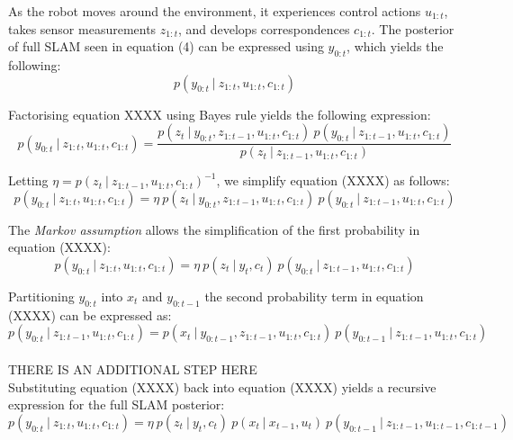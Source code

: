 \documentclass[a4paper]{article}
\begin{document}
As the robot moves around the environment, it experiences control actions $u_{1:t}$, takes sensor measurements $z_{1:t}$, and develops correspondences $c_{1:t}$. The posterior of full SLAM seen in equation (4) can be expressed using $y_{0:t}$, which yields the following:
\begin{equation}
p(y_{0:t} \ | \ z_{1:t}, u_{1:t}, c_{1:t})
\end{equation}

Factorising equation XXXX using Bayes rule yields the following expression:
\begin{equation}
p(y_{0:t} \ | \ z_{1:t}, u_{1:t}, c_{1:t}) = \frac{p(z_t \ | \ y_{0:t}, z_{1:t-1}, u_{1:t}, c_{1:t}) \ p(y_{0:t} \ | \ z_{1:t-1}, u_{1:t}, c_{1:t})}{p(z_t \ | \ z_{1:t-1}, u_{1:t}, c_{1:t})}
\end{equation}

Letting $\eta = p(z_t \ | \ z_{1:t-1}, u_{1:t}, c_{1:t})^{-1}$, we simplify equation (XXXX) as follows:
\begin{equation}
p(y_{0:t} \ | \ z_{1:t}, u_{1:t}, c_{1:t}) = \eta \ p(z_t \ | \ y_{0:t}, z_{1:t-1}, u_{1:t}, c_{1:t}) \ p(y_{0:t} \ | \ z_{1:t-1}, u_{1:t}, c_{1:t})
\end{equation}

The \textit{Markov assumption} allows the simplification of the first probability in equation (XXXX):
\begin{equation}
p(y_{0:t} \ | \ z_{1:t}, u_{1:t}, c_{1:t}) = \eta \ p(z_t \ | \ y_t, c_t) \ p(y_{0:t} \ | \ z_{1:t-1}, u_{1:t}, c_{1:t})
\end{equation}

Partitioning $y_{0:t}$ into $x_t$ and $y_{0:t-1}$ the second probability term in equation (XXXX) can be expressed as:
\begin{equation}
p(y_{0:t} \ | \ z_{1:t-1}, u_{1:t}, c_{1:t}) = p(x_t \ | \ y_{0:t-1}, z_{1:t-1}, u_{1:t}, c_{1:t}) \ p(y_{0:t-1} \ | \ z_{1:t-1}, u_{1:t}, c_{1:t})
\end{equation}
\\
THERE IS AN ADDITIONAL STEP HERE
\\

Substituting equation (XXXX) back into equation (XXXX) yields a recursive expression for the full SLAM posterior:
\begin{equation}
p(y_{0:t} \ | \ z_{1:t}, u_{1:t}, c_{1:t}) = \eta \ p(z_t \ | \ y_t, c_t) \ p(x_t \ | \ x_{t-1}, u_t) \ p(y_{0:t-1} \ | \ z_{1:t-1}, u_{1:t-1}, c_{1:t-1})
\end{equation}
\end{document}
